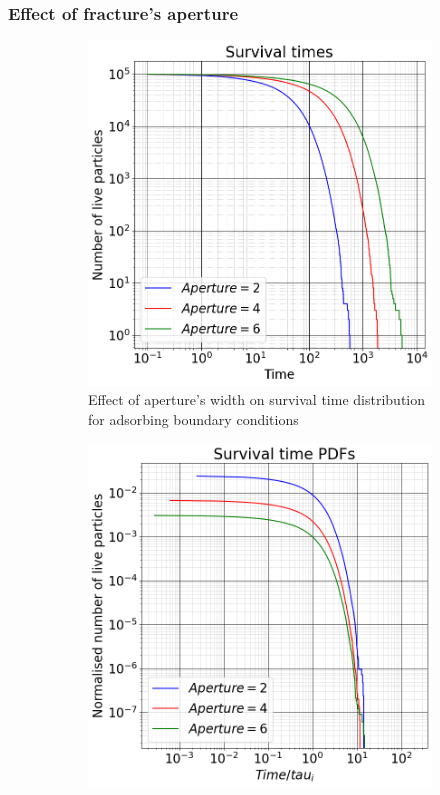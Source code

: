 \documentclass{article}
\begin{document}
\FloatBarrier  %
\subsubsection{Effect of fracture's aperture}
\begin{figure}[htbp]
    \centering
    \begin{subfigure}[b]{0.45\textwidth}
        \centering
        \includegraphics[width=\textwidth]{images/survTimeDistCompareApe.png}
        \caption{Effect of aperture's width on survival time distribution for adsorbing boundary conditions}
    \end{subfigure}
    \hfill
    \begin{subfigure}[b]{0.45\textwidth}
        \centering
        \includegraphics[width=\textwidth]{images/survTimeDistCompareApeNorm.png}

\end{subfigure}
\end{figure}
\end{document}

